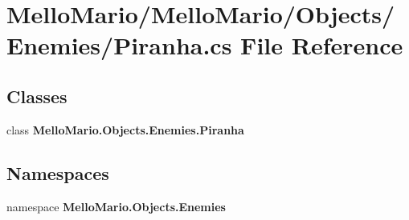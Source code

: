 \section{Mello\+Mario/\+Mello\+Mario/\+Objects/\+Enemies/\+Piranha.cs File Reference}
\label{Piranha_8cs}
\subsection*{Classes}
\begin{DoxyCompactItemize}
\item 
class \textbf{ Mello\+Mario.\+Objects.\+Enemies.\+Piranha}
\end{DoxyCompactItemize}
\subsection*{Namespaces}
\begin{DoxyCompactItemize}
\item 
namespace \textbf{ Mello\+Mario.\+Objects.\+Enemies}
\end{DoxyCompactItemize}
